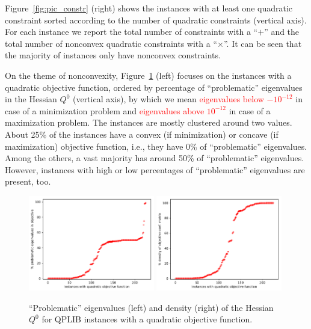 Figure~\ref{fig:pic_constr} (right) shows the instances with at least one quadratic constraint sorted according to the number of quadratic constraints (vertical axis). For each instance we report the total number of constraints with a ``$+$''
and the total number of nonconvex quadratic constraints
with a ``$\times$''.
It can be seen that the majority of instances only have nonconvex constraints. %




On the theme of nonconvexity, Figure~\ref{fig:pic_neg_eig} (left) focuses on
the instances with a quadratic objective function, ordered by 
 percentage of ``problematic'' eigenvalues in the Hessian $Q^0$ (vertical axis), by which
we mean \textcolor{red}{eigenvalues below $-10^{-12}$} in case of a minimization problem and \textcolor{red}{eigenvalues above $10^{-12}$} in case of a maximization problem.
The instances are mostly clustered around two values. About 25\% of the instances have a convex (if minimization) or concave (if maximization) objective function,
i.e., they have 0\% of ``problematic'' eigenvalues. Among the others, a vast
majority has around 50\% of ``problematic'' eigenvalues. However, instances
with high or low percentages of ``problematic'' eigenvalues are present, too.

\begin{figure}\centering
  \includegraphics[width=0.49\textwidth]{pic_neg_eig.pdf}
  \includegraphics[width=0.49\textwidth]{pic_density.pdf}
  \caption{``Problematic'' eigenvalues (left) and density (right) of the Hessian $Q^0$ for QPLIB instances with a quadratic objective function. \label{fig:pic_neg_eig}}
\end{figure}

